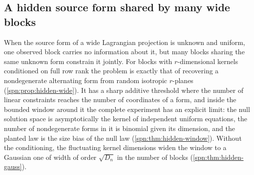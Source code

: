 \subsection{A hidden source form shared by many wide blocks}\label{spn:sec:hidden}

When the source form of a wide Lagrangian projection is unknown and uniform, one observed block
carries no information about it, but many blocks sharing the same unknown form constrain it
jointly. For blocks with $r$-dimensional kernels conditioned on full row rank the problem is
exactly that of recovering a nondegenerate alternating form from random isotropic $r$-planes
(\cref{spn:prop:hidden-wide}). It has a sharp additive threshold where the number of linear
constraints reaches the number of coordinates of a form, and inside the bounded window around it
the complete experiment has an explicit limit: the null solution space is asymptotically the kernel
of independent uniform equations, the number of nondegenerate forms in it is binomial given its
dimension, and the planted law is the size bias of the null law (\cref{spn:thm:hidden-window}).
Without the conditioning, the fluctuating kernel dimensions widen the window to a Gaussian one of
width of order $\sqrt{D_n}$ in the number of blocks (\cref{spn:thm:hidden-gauss}).

